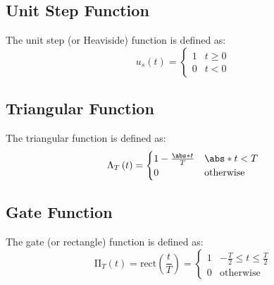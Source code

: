 \documentclass{article}
\begin{document}
\subsection{Unit Step Function}
The unit step (or Heaviside) function is defined as:
\begin{equation*}
    u_s\left( t \right) = \begin{cases}
        1 & t \geq 0 \\
        0 & t < 0
    \end{cases}
\end{equation*}
\subsection{Triangular Function}
The triangular function is defined as:
\begin{equation*}
    \Lambda_T\left( t \right) = \begin{cases}
        1 - \frac{\abs*{t}}{T} & \abs*{t} < T     \\
        0                      & \text{otherwise}
    \end{cases}
\end{equation*}
\subsection{Gate Function}
The gate (or rectangle) function is defined as:
\begin{equation*}
    \mathrm{\Pi}_T\left( t \right) = \mathrm{rect}\left( \frac{t}{T} \right) = \begin{cases}
        1 & -\frac{T}{2} \leq t \leq \frac{T}{2} \\
        0 & \text{otherwise}
    \end{cases}
\end{equation*}
\end{document}
